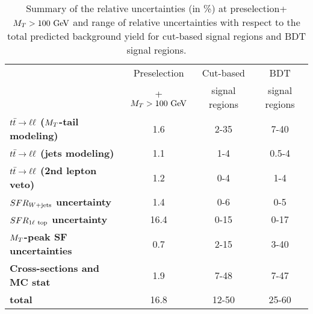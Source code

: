 
            \begin{table}[!ht]
                \begin{center}
                    \begin{tabular}{|l|c|cc|}
                        \hline
                                                                       & Preselection    & Cut-based      & BDT             \\
                                                                       & + $M_T>100~\text{GeV}$ & signal regions & signal regions  \\
                        \hline
                        \textbf{$t\bar{t} \rightarrow \ell \ell$ ($M_T$-tail modeling)}  & 1.6                      & 2-35         & 7-40    \\
                        \textbf{$t\bar{t} \rightarrow \ell \ell$ (jets modeling)}        & 1.1                      & 1-4          & 0.5-4   \\
                        \textbf{$t\bar{t} \rightarrow \ell \ell$ (2nd lepton veto)}      & 1.2                      & 0-4          & 1-4     \\
                        \textbf{$SFR_{\text{$W$+jets}}$ uncertainty}               & 1.4                      & 0-6          & 0-5     \\
                        \textbf{$SFR_{1\ell~\text{top}}$ uncertainty}        & 16.4                     & 0-15         & 0-17    \\
                        \textbf{$M_T$-peak SF uncertainties}           & 0.7                      & 2-15         & 3-40    \\
                        \textbf{Cross-sections and MC stat}            & 1.9                      & 7-48         & 7-47    \\
                        \hline
                        \textbf{total}                                 & 16.8                     & 12-50        & 25-60   \\
                        \hline
                    \end{tabular}
                    \caption{Summary of the relative uncertainties (in \%) at preselection+$M_T>100~\text{GeV}$
                    and range of relative uncertainties with respect to the total predicted
                    background yield for cut-based signal regions and BDT signal regions.
                    \label{tab:systematicsSummary}}
                \end{center}
            \end{table}

